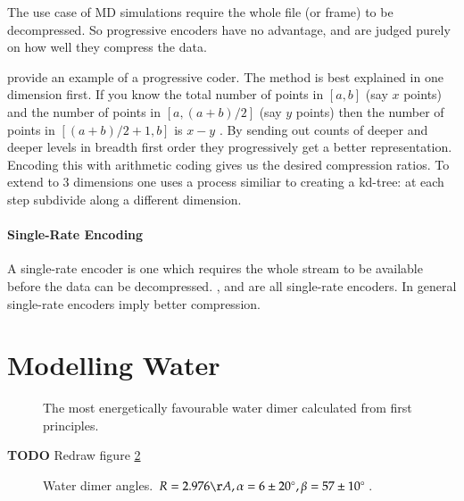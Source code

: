 \documentclass[a4paper]{report}
\newcommand{\degree}{\ensuremath{^\circ}}
\newcommand{\todo}{\textbf{TODO} }
\begin{document}
The use case of MD simulations require the whole file (or frame) to be
decompressed. So progressive encoders have no advantage, and are judged purely
on how well they compress the data.

\citet{devillers2000gci} provide an example of a progressive coder. The method
is best explained in one dimension first. If you know the total number of
points in $[a, b]$ (say $x$ points) and the number of points in $[a, (a+b)/2]$
(say $y$ points) then the number of points in $[(a+b)/2+1, b]$ is $x - y$ . By
sending out counts of deeper and deeper levels in breadth first order they
progressively get a better representation. Encoding this with arithmetic
coding gives us the desired compression ratios. To extend to 3 dimensions one
uses a process similiar to creating a kd-tree: at each step subdivide along a
different dimension.

\paragraph{Single-Rate Encoding}
A single-rate encoder is one which requires the whole stream to be available
before the data can be decompressed. \citet{omeltchenko2000sls},
\citet{gumholdcomp} and \citet{merrycomp} are all single-rate encoders. In
general single-rate encoders imply better compression.


\section{Modelling Water}
\label{sec:modelling-water}

\begin{figure}[h]
\centering
{}
\caption{The most energetically favourable water dimer calculated from first
  principles. \citep{watermolecule}}
\label{fig:dimer}
\end{figure}

\todo Redraw figure \ref{fig:dimer-angle}
\begin{figure}[h]
\centering
{}
\caption{Water dimer angles. $R = 2.976\AA, \alpha = 6 \pm 20\degree, \beta =
  57 \pm 10\degree$. \citep{watermolecule}}
\label{fig:dimer-angle}
\end{figure}
\end{document}
